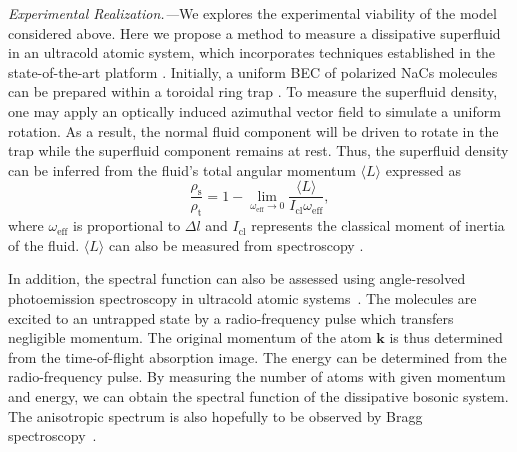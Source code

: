 \documentclass[aps,prl,twocolumn,superscriptaddress,]{revtex4-1}
\newcommand{\tmmathbf}[1]{\ensuremath{\boldsymbol{#1}}}
\newcommand{\tmop}[1]{\ensuremath{\operatorname{#1}}}
\begin{document}

\emph{Experimental Realization.---}We explores the experimental viability of the model considered above. Here we propose a method to measure a dissipative superfluid in an ultracold atomic system, which incorporates techniques established in the state-of-the-art platform \citep{PhysRevLett.104.030401}. Initially, a uniform BEC of polarized NaCs molecules can be prepared within a toroidal ring trap \citep{PhysRevLett.104.030401,PhysRevLett.110.025302}. To measure the superfluid density, one may apply an optically induced azimuthal vector field to simulate a uniform rotation. As a result, the normal fluid component will be driven to rotate in the trap while the superfluid component remains at rest. Thus, the superfluid density can be inferred from the fluid's total angular momentum $\langle L\rangle$ expressed as \cite{PhysRevLett.104.030401}
\begin{equation}
	\frac{\rho_{\mathrm{s}}}{\rho_{\mathrm{t}}}=1-\lim_{\omega_{\mathrm{eff}}\to0}\frac{\langle L\rangle}{I_{\mathrm{cl}}\omega_{\mathrm{eff}}},
\end{equation}
where $\omega_{\mathrm{eff}}$ is proportional to $\Delta l$ and $I_{\mathrm{cl}}$ represents the classical moment of inertia of the fluid. $\langle L\rangle$ can also be measured from spectroscopy \cite{PhysRevLett.104.030401}.

In addition, the spectral function can also be assessed using angle-resolved
photoemission spectroscopy in ultracold atomic systems~\citep{Brown2020,PhysRevB.97.125117}. The molecules are excited to an untrapped state by a radio-frequency pulse which transfers negligible momentum. The original momentum of the atom $\bm{k}$ is thus determined from the time-of-flight absorption image. The energy can be determined from the radio-frequency pulse. By measuring the number of atoms with given momentum and energy, we can obtain the spectral function of the dissipative bosonic system. The anisotropic spectrum is also hopefully to be observed by Bragg spectroscopy~\cite{Bismut2012}.
\end{document}
